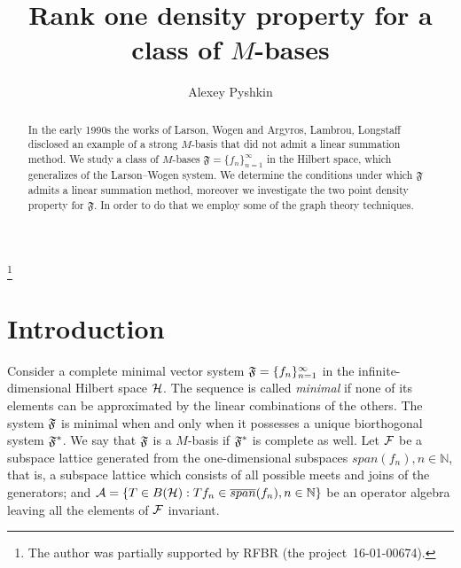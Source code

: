 \documentclass[12pt]{amsart}
\begin{document}
\title{Rank one density property for a class of $M$-bases}
\author{Alexey Pyshkin}
\begin{abstract}
  In the early 1990s the works of Larson, Wogen and Argyros, Lambrou, Longstaff
    disclosed an example of a strong $M$-basis that did not admit a linear summation method.
  We study a class of $M$-bases $\mathfrak{F}=\{f_n\}_{n=1}^\infty$ in the Hilbert space, which
    generalizes of the Larson--Wogen system.
  We determine the conditions under which $\mathfrak{F}$ admits a linear summation method, moreover
    we investigate the two point density property for $\mathfrak{F}$.
  In order to do that we employ some of the graph theory techniques.
\end{abstract}
\thanks{The author was partially supported by RFBR (the project~16-01-00674).}
\maketitle

\section{Introduction}
  Consider a complete minimal vector system $\fsys = \seq{f}$ in the infinite-dimensional Hilbert space $\cal{H}$.
  The sequence is called \emph{minimal} if none of its elements can be approximated by the linear combinations of the others.
  The system $\fsys$ is minimal when and only when it possesses a unique biorthogonal system $\fstarsys$.
  We say that $\fsys$ is a $M$-basis if $\fstarsys$ is complete as well.
  Let $\cal{F}$ be a subspace lattice generated from the one-dimensional subspaces $span(f_n), n \in \mathbb{N}$,
    that is, a subspace lattice which consists of all possible meets and joins of the generators;
    and $\cal{A} = \{T\in B(\cal{H}): Tf_n \in \overline{span}(f_n), n \in \mathbb{N}\}$ be an operator algebra leaving all the elements of
    $\cal{F}$ invariant.
\end{document}
